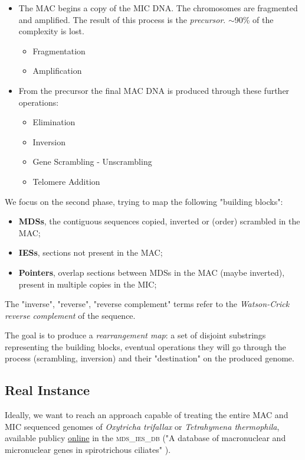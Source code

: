 \begin{itemize}
	\item The MAC begins a copy of the MIC DNA. The chromosomes are fragmented and amplified. The result of this process is the \textit{precursor}. $\sim$90\% of the complexity is lost.
	\begin{itemize}
    	\item Fragmentation
    	\item Amplification
    \end{itemize}

	\item From the precursor the final MAC DNA is produced through these further operations:
	\begin{itemize}
    	\item Elimination
    	\item Inversion
    	\item Gene Scrambling - Unscrambling
    	\item Telomere Addition
    \end{itemize}

\end{itemize}

We focus on the second phase, trying to map the following "building blocks":

\begin{itemize}
	\item \textbf{MDSs}, the contiguous sequences copied, inverted or (order) scrambled in the MAC;
	\item \textbf{IESs}, sections not present in the MAC;
	\item \textbf{Pointers}, overlap sections between MDSs in the MAC (maybe inverted), present in multiple copies in the MIC;
\end{itemize}

The "inverse", "reverse", "reverse complement" terms refer to the \textit{Watson-Crick reverse complement} of the sequence.

The goal is to produce a \textit{rearrangement map}: a set of disjoint substrings representing the building blocks, eventual operations they will go through the process (scrambling, inversion) and their "destination" on the produced genome.

\subsection{Real Instance}

Ideally, we want to reach an approach capable of treating the entire MAC and MIC sequenced genomes of \textit{Oxytricha trifallax} or \textit{Tetrahymena thermophila}, available publicy \href{http://oxytricha.princeton.edu/mds_ies_db/}{online} in the \textsc{mds\_ies\_db} ("A database of macronuclear and micronuclear genes in spirotrichous ciliates" \cite{mdsiesdb}).

